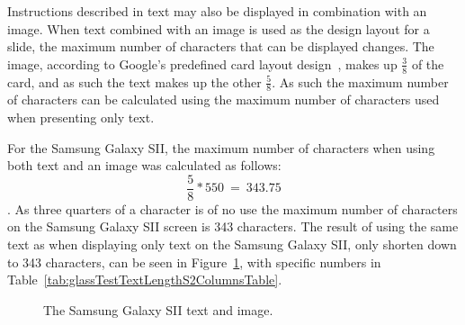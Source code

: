Instructions described in text may also be displayed in combination with an image. When text combined with an image is used as the design layout for a slide, the maximum number of characters that can be displayed changes. The image, according to Google's predefined card layout design~\cite{glassDesignStyle}, makes up \(\frac{3}{8}\) of the card, and as such the text makes up the other \(\frac{5}{8}\). As such the maximum number of characters can be calculated using the maximum number of characters used when presenting only text.

For the Samsung Galaxy SII, the maximum number of characters when using both text and an image was calculated as follows: \[\frac{5}{8}*550~=~343.75\]. As three quarters of a character is of no use the maximum number of characters on the Samsung Galaxy SII screen is 343 characters. The result of using the same text as when displaying only text on the  Samsung Galaxy SII, only shorten down to 343 characters, can be seen in Figure~\ref{glassTestTextLengthS2Columns}, with specific numbers in Table~\ref{tab:glassTestTextLengthS2ColumnsTable}.

	\begin{figure}[H]%
		\centering
   		 \qquad
   		 \qquad
   		 \qquad
		\caption{The Samsung Galaxy SII text and image.}
		\label{glassTestTextLengthS2Columns}
	\end{figure}

